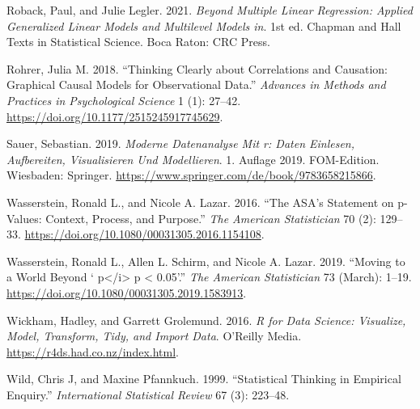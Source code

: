 \documentclass[
  letterpaper,
  DIV=11,
  numbers=noendperiod]{scrreprt}
\newlength{\cslhangindent}
\newlength{\cslentryspacingunit} %
\newenvironment{CSLReferences}[2] %
 {%
  \setlength{\parindent}{0pt}
  \ifodd #1
  \let\oldpar\par
  \def\par{\hangindent=\cslhangindent\oldpar}
  \fi
  \setlength{\parskip}{#2\cslentryspacingunit}
 }%
 {}
\theoremstyle{definition}
\theoremstyle{definition}
\theoremstyle{remark}
\begin{document}
\begin{CSLReferences}{1}{0}
\leavevmode{}%
Roback, Paul, and Julie Legler. 2021. \emph{Beyond Multiple Linear
Regression: Applied Generalized Linear Models and Multilevel Models in}.
1st ed. Chapman and Hall Texts in Statistical Science. Boca Raton: {CRC}
Press.

\leavevmode{}%
Rohrer, Julia M. 2018. {``Thinking Clearly about Correlations and
Causation: Graphical Causal Models for Observational Data.''}
\emph{Advances in Methods and Practices in Psychological Science} 1 (1):
27--42. \url{https://doi.org/10.1177/2515245917745629}.

\leavevmode{}%
Sauer, Sebastian. 2019. \emph{Moderne Datenanalyse Mit r: Daten
Einlesen, Aufbereiten, Visualisieren Und Modellieren}. 1. Auflage 2019.
{FOM}-Edition. Wiesbaden: Springer.
\url{https://www.springer.com/de/book/9783658215866}.

\leavevmode{}%
Wasserstein, Ronald L., and Nicole A. Lazar. 2016. {``The {ASA}'s
Statement on p-Values: Context, Process, and Purpose.''} \emph{The
American Statistician} 70 (2): 129--33.
\url{https://doi.org/10.1080/00031305.2016.1154108}.

\leavevmode{}%
Wasserstein, Ronald L., Allen L. Schirm, and Nicole A. Lazar. 2019.
{``Moving to a World Beyond {` p{\textless{}}/i{\textgreater{}} p
{\textless{}} 0.05'}.''} \emph{The American Statistician} 73 (March):
1--19. \url{https://doi.org/10.1080/00031305.2019.1583913}.

\leavevmode{}%
Wickham, Hadley, and Garrett Grolemund. 2016. \emph{R for Data Science:
Visualize, Model, Transform, Tidy, and Import Data}. O'Reilly Media.
\url{https://r4ds.had.co.nz/index.html}.

\leavevmode{}%
Wild, Chris J, and Maxine Pfannkuch. 1999. {``Statistical Thinking in
Empirical Enquiry.''} \emph{International Statistical Review} 67 (3):
223--48.

\end{CSLReferences}
\end{document}
